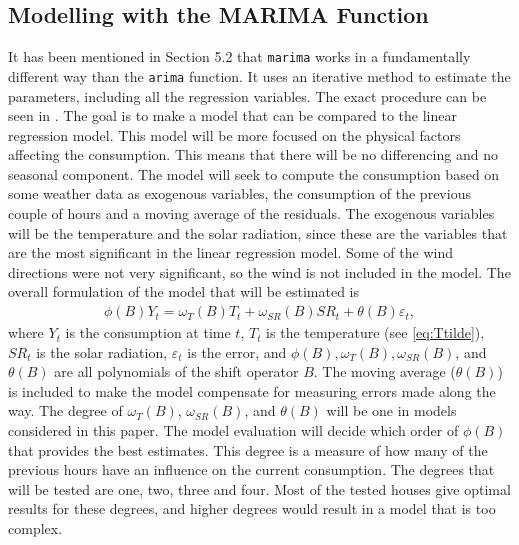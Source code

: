 \subsection{Modelling with the MARIMA Function}
It has been mentioned in Section 5.2 that \texttt{marima} works in a fundamentally different way than the \texttt{arima} function. It uses an iterative method to estimate the parameters, including all the regression variables. The exact procedure can be seen in \cite{marima}. The goal is to make a model that can be compared to the linear regression model. This model will be more focused on the physical factors affecting the consumption. This means that there will be no differencing and no seasonal component. The model will seek to compute the consumption based on some weather data as exogenous variables, the consumption of the previous couple of hours and a moving average of the residuals. The exogenous variables will be the temperature and the solar radiation, since these are the variables that are the most significant in the linear regression model. Some of the wind directions were not very significant, so the wind is not included in the model. The overall formulation of the model that will be estimated is
\begin{align}
    \phi (B) Y_t =  \omega_{T}(B)T_t + \omega_{SR}(B)SR_t + \theta (B) \varepsilon_t,
    \label{eq:MARIMA1}
\end{align}
where $Y_t$ is the consumption at time $t$, $T_t$ is the temperature (see \cref{eq:Ttilde}), $SR_t$ is the solar radiation, $\varepsilon_t$ is the error, and $\phi(B), \omega_{T}(B), \omega_{SR}(B)$, and $\theta(B)$ are all polynomials of the shift operator $B$. The moving average ($\theta(B)$) is included to make the model compensate for measuring errors made along the way. The degree of $\omega_{T}(B)$, $\omega_{SR}(B)$, and $\theta(B)$ will be one in models considered in this paper. The model evaluation will decide which order of $\phi(B)$ that provides the best estimates. This degree is a measure of how many of the previous hours have an influence on the current consumption. The degrees that will be tested are one, two, three and four. Most of the tested houses give optimal results for these degrees, and higher degrees would result in a model that is too complex.

